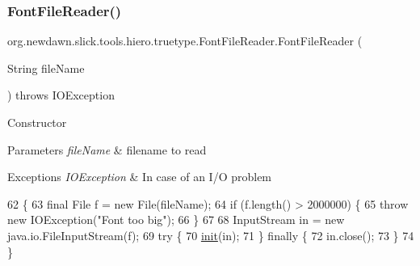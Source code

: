 \subsubsection{\texorpdfstring{Font\+File\+Reader()}{FontFileReader()}\hspace{0.1cm}{\footnotesize\ttfamily [1/3]}}
{\footnotesize\ttfamily org.\+newdawn.\+slick.\+tools.\+hiero.\+truetype.\+Font\+File\+Reader.\+Font\+File\+Reader (\begin{DoxyParamCaption}\item[{String}]{file\+Name }\end{DoxyParamCaption}) throws I\+O\+Exception\hspace{0.3cm}{\ttfamily [inline]}}

Constructor


\begin{DoxyParams}{Parameters}
{\em file\+Name} & filename to read \\
\hline
\end{DoxyParams}

\begin{DoxyExceptions}{Exceptions}
{\em I\+O\+Exception} & In case of an I/O problem \\
\hline
\end{DoxyExceptions}

\begin{DoxyCode}
62                                                               \{
63         \textcolor{keyword}{final} File f = \textcolor{keyword}{new} File(fileName);
64         \textcolor{keywordflow}{if} (f.length() > 2000000) \{
65             \textcolor{keywordflow}{throw} \textcolor{keyword}{new} IOException(\textcolor{stringliteral}{"Font too big"});
66         \}
67         
68         InputStream in = \textcolor{keyword}{new} java.io.FileInputStream(f);
69         \textcolor{keywordflow}{try} \{
70             \mbox{\hyperlink{classorg_1_1newdawn_1_1slick_1_1tools_1_1hiero_1_1truetype_1_1_font_file_reader_ae548c9d2f8c005c44be47a00c173c44b}{init}}(in);
71         \} \textcolor{keywordflow}{finally} \{
72             in.close();
73         \}
74     \}
\end{DoxyCode}
\mbox{\label{classorg_1_1newdawn_1_1slick_1_1tools_1_1hiero_1_1truetype_1_1_font_file_reader_a6ff9dd245ac6799f5e1724569e8cf81c}} 
